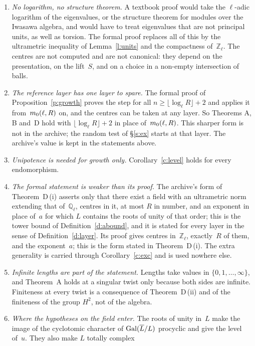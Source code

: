 \documentclass[11pt,a4paper]{article}
\newcommand{\Q}{\mathbb{Q}}
\newcommand{\Z}{\mathbb{Z}}
\newcommand{\m}[1]{\mbox{$#1$}}        %
\theoremstyle{plainx}
\theoremstyle{uprightx}
\begin{document}
\begin{enumerate}[label=\textup{\arabic*.},leftmargin=1.6em,itemsep=5pt]
\item \emph{No logarithm, no structure theorem.} A textbook proof would take the $\ell$-adic logarithm of the
eigenvalues, or the structure theorem for modules over the Iwasawa algebra, and would have to treat eigenvalues
that are not principal units, as well as torsion. The formal proof replaces all of this by the ultrametric
inequality of Lemma~\ref{l:units} and the compactness of~$\Z_\ell$. The centres are not computed and are not
canonical: they depend on the presentation, on the lift~$S$, and on a choice in a non-empty intersection of balls.
\item \emph{The reference layer has one layer to spare.} The formal proof of Proposition~\ref{p:growth} proves
the step for all \m{n\ge\lfloor\log_\ell R\rfloor+2} and applies it from~$m_0(\ell,R)$ on, and the centres can be taken
at any layer. So Theorems A, B and~D hold with \m{\lfloor\log_\ell R\rfloor+2} in place of~$m_0(\ell,R)$. This sharper
form is not in the archive; the random test of §\ref{s:ex} starts at that layer. The archive's value is kept in
the statements above.
\item \emph{Unipotence is needed for growth only.} Corollary~\ref{c:level} holds for every endomorphism.
\item \emph{The formal statement is weaker than its proof.} The archive's form of Theorem~D\,(i) asserts only
that there exist a field with an ultrametric norm extending that of~$\Q_\ell$, centres in it, at most $R$ in
number, and an exponent in place of~$a$ for which $L$ contains the roots of unity of that order; this is the tower
bound of Definition~\ref{d:abound}, and it is stated for every layer in the sense of Definition~\ref{d:layer}. Its
proof gives centres in~$\Z_\ell$, exactly~$R$ of them, and the exponent~$a$; this is the form stated in
Theorem~D\,(i). The extra generality is carried through Corollary~\ref{c:exc} and is used nowhere else.
\item \emph{Infinite lengths are part of the statement.} Lengths take values in \m{\{0,1,\dots,\infty\}}, and
Theorem~A holds at a singular twist only because both sides are infinite. Finiteness at every twist is a
consequence of Theorem~D\,(ii) and of the finiteness of the group $H^2$, not of the algebra.
\item \emph{Where the hypotheses on the field enter.} The roots of unity in~$L$ make the image of the cyclotomic
character of \m{\GalG{L}{\overline L}} procyclic and give the level of~$u$. They also make $L$ totally complex

\end{enumerate}
\end{document}
